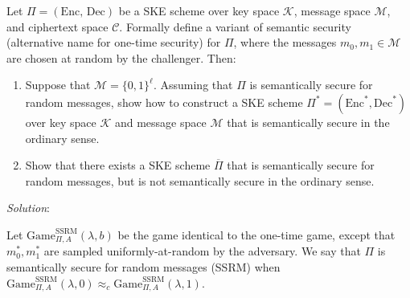 \documentclass[a4paper, 12pt]{report}
\begin{document}
    \begin{framedprob}{}
        Let $\Pi = (\text{Enc, Dec})$ be a SKE scheme over key space $\mathcal{K}$, message space $\mathcal{M}$, and ciphertext space $\mathcal{C}$. Formally define a variant of semantic security (alternative name for one-time security) for $\Pi$, where the messages $m_0, m_1 \in \mathcal{M}$ are chosen at random by the challenger. Then:
    
        \begin{enumerate}
            \item Suppose that $\mathcal{M} = \{0,1\}^\ell$. Assuming that $\Pi$ is semantically secure for random messages, show how to construct a SKE scheme $\Pi^* = (\text{Enc}^*, \text{Dec}^*)$ over key space $\mathcal{K}$ and message space $\mathcal{M}$ that is semantically secure in the ordinary sense.
            
            \item Show that there exists a SKE scheme $\overline{\Pi}$ that is semantically secure for random messages, but is not semantically secure in the ordinary sense.
        \end{enumerate}
    \end{framedprob}

    \textit{Solution}:

    Let $\mathrm{Game}_{\Pi,A}^{\text{SSRM}}(\lambda, b)$ be the game identical to the one-time game, except that $m_0^*, m_1^*$ are sampled uniformly-at-random by the adversary. We say that $\Pi$ is semantically secure for random messages (SSRM) when $\mathrm{Game}_{\Pi,A}^{\text{SSRM}}(\lambda, 0) \approx_c \mathrm{Game}_{\Pi,A}^{\text{SSRM}}(\lambda, 1)$.
\end{document}
